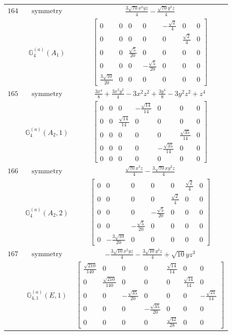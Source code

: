 \documentclass[fleqn,8pt,landscape]{jsarticle}
\begin{document}
\begin{longtable}{ccc}
$ 164 $ & $ \text{symmetry} $ & $ \frac{3 \sqrt{70} x^{2} y z}{4} - \frac{\sqrt{70} y^{3} z}{4} $ \\
$  $ & $ \mathbb{G}_{4}^{(a)}(A_{1}) $ & $ \begin{bmatrix} 0 & 0 & 0 & 0 & - \frac{\sqrt{2}}{4} & 0 & 0 \\ 0 & 0 & 0 & 0 & 0 & \frac{\sqrt{2}}{4} & 0 \\ 0 & 0 & \frac{\sqrt{5}}{20} & 0 & 0 & 0 & 0 \\ 0 & 0 & 0 & - \frac{\sqrt{5}}{20} & 0 & 0 & 0 \\ \frac{3 \sqrt{10}}{20} & 0 & 0 & 0 & 0 & 0 & 0 \end{bmatrix} $ \\ \hline
$ 165 $ & $ \text{symmetry} $ & $ \frac{3 x^{4}}{8} + \frac{3 x^{2} y^{2}}{4} - 3 x^{2} z^{2} + \frac{3 y^{4}}{8} - 3 y^{2} z^{2} + z^{4} $ \\
$  $ & $ \mathbb{G}_{4}^{(a)}(A_{2},1) $ & $ \begin{bmatrix} 0 & 0 & 0 & - \frac{\sqrt{14}}{14} & 0 & 0 & 0 \\ 0 & 0 & \frac{\sqrt{14}}{14} & 0 & 0 & 0 & 0 \\ 0 & 0 & 0 & 0 & 0 & \frac{\sqrt{35}}{14} & 0 \\ 0 & 0 & 0 & 0 & - \frac{\sqrt{35}}{14} & 0 & 0 \\ 0 & 0 & 0 & 0 & 0 & 0 & 0 \end{bmatrix} $ \\ \hline
$ 166 $ & $ \text{symmetry} $ & $ \frac{\sqrt{70} x^{3} z}{4} - \frac{3 \sqrt{70} x y^{2} z}{4} $ \\
$  $ & $ \mathbb{G}_{4}^{(a)}(A_{2},2) $ & $ \begin{bmatrix} 0 & 0 & 0 & 0 & 0 & \frac{\sqrt{2}}{4} & 0 \\ 0 & 0 & 0 & 0 & \frac{\sqrt{2}}{4} & 0 & 0 \\ 0 & 0 & 0 & - \frac{\sqrt{5}}{20} & 0 & 0 & 0 \\ 0 & 0 & - \frac{\sqrt{5}}{20} & 0 & 0 & 0 & 0 \\ 0 & - \frac{3 \sqrt{10}}{20} & 0 & 0 & 0 & 0 & 0 \end{bmatrix} $ \\ \hline
$ 167 $ & $ \text{symmetry} $ & $ - \frac{3 \sqrt{10} x^{2} y z}{4} - \frac{3 \sqrt{10} y^{3} z}{4} + \sqrt{10} y z^{3} $ \\
$  $ & $ \mathbb{G}_{4,1}^{(a)}(E,1) $ & $ \begin{bmatrix} \frac{\sqrt{210}}{140} & 0 & 0 & 0 & \frac{\sqrt{14}}{14} & 0 & 0 \\ 0 & \frac{\sqrt{210}}{140} & 0 & 0 & 0 & \frac{\sqrt{14}}{14} & 0 \\ 0 & 0 & - \frac{\sqrt{35}}{20} & 0 & 0 & 0 & - \frac{\sqrt{21}}{14} \\ 0 & 0 & 0 & - \frac{\sqrt{35}}{20} & 0 & 0 & 0 \\ 0 & 0 & 0 & 0 & \frac{\sqrt{42}}{28} & 0 & 0 \end{bmatrix} $ \\ \hline

\end{longtable}
\end{document}
